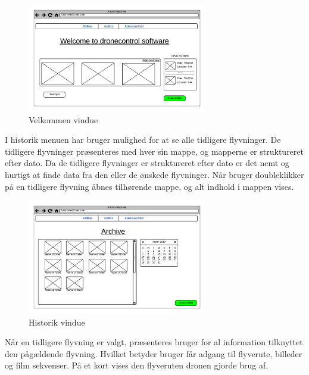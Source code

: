 \vspace{-5pt}
 \begin{figure}[H]
 	\centering
 	\includegraphics[width=0.7\textwidth]{Billeder/UI_mockups/index.png}
 	\vspace{-5pt}
 	\caption{Velkommen vindue}
 	\label{fig:mockup_welcome}
 \end{figure} 

\vspace{2cm}

I historik menuen har bruger mulighed for at se alle tidligere flyvninger. De tidligere flyvninger præsenteres med hver sin mappe, og mapperne er struktureret efter dato. Da de tidligere flyvninger er struktureret efter dato er det nemt og hurtigt at finde data fra den eller de ønskede flyvninger. Når bruger doubleklikker på en tidligere flyvning åbnes tilhørende mappe, og alt indhold i mappen vises.

\vspace{-5pt}
\begin{figure}[H]
	\centering
	\includegraphics[width=0.7\textwidth]{Billeder/UI_mockups/archive.png}
	\vspace{-5pt}
	\caption{Historik vindue}
	\label{fig:mockup_archive}
\end{figure}

\newpage

Når en tidligere flyvning er valgt, præsenteres bruger for al information tilknyttet den pågældende flyvning. Hvilket betyder bruger får adgang til flyverute, billeder og film sekvenser. På et kort vises den flyveruten dronen gjorde brug af.

